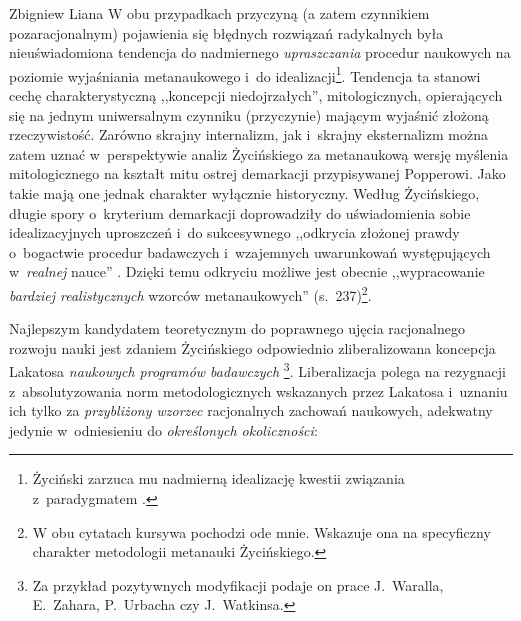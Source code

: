 \begin{artplenv}{Zbigniew Liana}
W obu przypadkach przyczyną (a zatem czynnikiem pozaracjonalnym) pojawienia się błędnych rozwiązań radykalnych była
nieuświadomiona tendencja do nadmiernego \textit{upraszczania} procedur naukowych na poziomie wyjaśniania
metanaukowego i~do idealizacji\footnote{Życiński zarzuca mu nadmierną idealizację kwestii związania z~paradygmatem
\parencite*[zob.][s.~152]{zycinski_jezyk_1983}.
}. Tendencja ta stanowi cechę charakterystyczną ,,koncepcji niedojrzałych'',
mitologicznych, opierających się na jednym uniwersalnym czynniku (przyczynie) mającym wyjaśnić złożoną rzeczywistość.
Zarówno skrajny internalizm, jak i~skrajny eksternalizm można zatem uznać w~perspektywie analiz Życińskiego za
metanaukową wersję myślenia mitologicznego na kształt mitu ostrej demarkacji przypisywanej Popperowi. Jako takie mają
one jednak charakter wyłącznie historyczny. Według Życińskiego, długie spory o~kryterium demarkacji doprowadziły do
uświadomienia sobie idealizacyjnych uproszczeń i~do sukcesywnego ,,odkrycia złożonej prawdy o~bogactwie procedur
badawczych i~wzajemnych uwarunkowań występujących w~\textit{realnej} nauce''
\parencite[s.~230]{zycinski_elementy_1996}.
Dzięki temu odkryciu możliwe jest obecnie ,,wypracowanie \textit{bardziej realistycznych} wzorców
metanaukowych'' (s.~237)\footnote{W obu cytatach kursywa
pochodzi ode mnie. Wskazuje ona na specyficzny charakter metodologii metanauki Życińskiego.}.

Najlepszym kandydatem teoretycznym do poprawnego ujęcia racjonalnego rozwoju nauki jest zdaniem Życińskiego odpowiednio
zliberalizowana koncepcja Lakatosa \textit{naukowych programów badawczych}
\parencite[s.~244n]{zycinski_elementy_1996}\footnote{Za przykład pozytywnych modyfikacji podaje on prace J.~Waralla, E.~Zahara,
P.~Urbacha czy J.~Watkinsa.}. Liberalizacja polega na rezygnacji z~absolutyzowania norm metodologicznych wskazanych przez
Lakatosa i~uznaniu ich tylko za \textit{przybliżony wzorzec} racjonalnych zachowań naukowych, adekwatny
jedynie w~odniesieniu do
\textit{określonych okoliczności}:


\end{artplenv}
